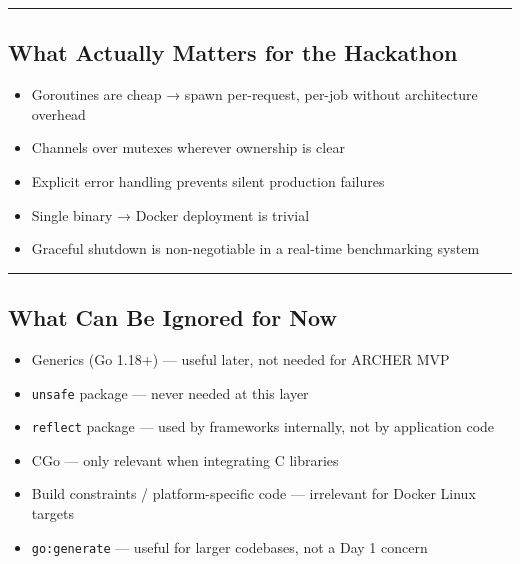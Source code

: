 \documentclass[11pt,openany]{book}
\providecommand{\tightlist}{%
  \setlength{\itemsep}{0pt}\setlength{\parskip}{0pt}}
\begin{document}
\begin{center}\rule{0.5\linewidth}{0.5pt}\end{center}

\hypertarget{what-actually-matters-for-the-hackathon}{%
\subsection{What Actually Matters for the
Hackathon}\label{what-actually-matters-for-the-hackathon}}

\begin{itemize}
\tightlist
\item
  Goroutines are cheap → spawn per-request, per-job without architecture
  overhead
\item
  Channels over mutexes wherever ownership is clear
\item
  Explicit error handling prevents silent production failures
\item
  Single binary → Docker deployment is trivial
\item
  Graceful shutdown is non-negotiable in a real-time benchmarking system
\end{itemize}

\begin{center}\rule{0.5\linewidth}{0.5pt}\end{center}

\hypertarget{what-can-be-ignored-for-now}{%
\subsection{What Can Be Ignored for
Now}\label{what-can-be-ignored-for-now}}

\begin{itemize}
\tightlist
\item
  Generics (Go 1.18+) --- useful later, not needed for ARCHER MVP
\item
  \texttt{unsafe} package --- never needed at this layer
\item
  \texttt{reflect} package --- used by frameworks internally, not by
  application code
\item
  CGo --- only relevant when integrating C libraries
\item
  Build constraints / platform-specific code --- irrelevant for Docker
  Linux targets
\item
  \texttt{go:generate} --- useful for larger codebases, not a Day 1
  concern
\end{itemize}
\end{document}
